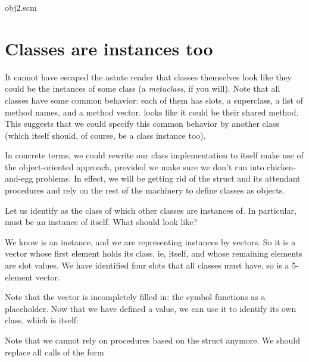 \scmfilename obj2.scm


\section{Classes are instances too}

It cannot have escaped the astute reader that classes
themselves look like they could be the instances of
some class (a {\em metaclass}, if you will).  Note that
all classes have some common behavior: each of them has
slots, a superclass, a list of method names, and a
method vector.   looks like it could
be their shared method.  This suggests that we could
specify this common behavior by another class (which
itself should, of course, be a class instance too).

In concrete terms, we could rewrite our class
implementation to itself make use of the
object-oriented approach, provided we make sure we
don't run into chicken-and-egg problems.  In effect, we
will be getting rid of the  struct and its
attendant procedures and rely on the rest of the
machinery to define classes as objects.

Let us identify  as the class of
which other classes are instances of.  In particular,
 must be an instance of itself.  What
should  look like?

We know  is an instance, and we are
representing instances by vectors.  So it is a
vector whose first element holds its class, ie,
itself, and whose remaining elements are slot values.
We have identified four slots that all classes must
have, so  is a 5-element vector.


\n Note that the  vector is
incompletely filled in: the symbol
 functions as a
placeholder.  Now that we have defined a
 value, we can use it to identify its
own class, which is itself:


Note that we cannot rely on procedures based on the
 struct anymore.  We should replace all calls
of the form

